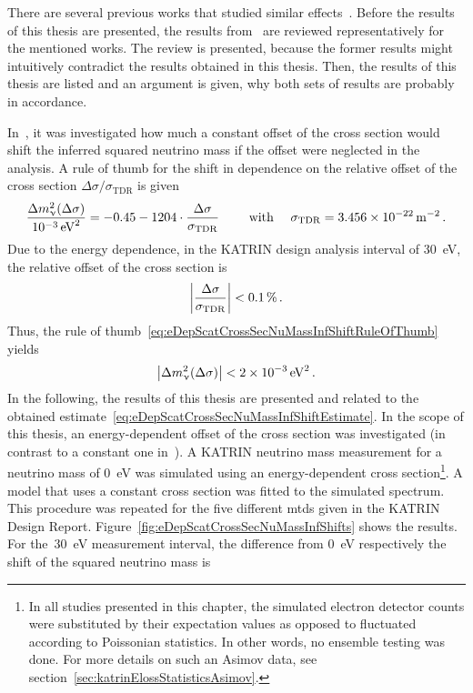 There are several previous works that studied similar effects~\cite{Antoni2015,Groh2015,SeitzM2019,Kuckert2016,Kuckert2018}. Before the results of this thesis are presented, the results from~\cite{Groh2015} are reviewed representatively for the mentioned works. The review is presented, because the former results might intuitively contradict the results obtained in this thesis. Then, the results of this thesis are listed and an argument is given, why both sets of results are probably in accordance.

In~\cite{Groh2015}, it was investigated how much a constant offset of the cross section would shift the inferred squared neutrino mass if the offset were neglected in the analysis. A rule of thumb for the shift in dependence on the relative offset of the cross section $\Delta\sigma/\sigma_\mathrm{TDR}$ is given~\cite{Groh2015}
\begin{equation}
	\label{eq:eDepScatCrossSecNuMassInfShiftRuleOfThumb}
	\frac{\Delta m_\upnu^2(\Delta\sigma)}{\SI{e-3}{eV^2}} =
	-0.45
	-1204\cdot
	\frac{
		\Delta\sigma
	}{
		\sigma_\mathrm{TDR}
	}
	\qquad \text{ with } \quad 
	\sigma_\mathrm{TDR} = \SI{3.456e-22}{m^{-2}}
	\text{\,.}
\end{equation}
Due to the energy dependence, in the KATRIN design analysis interval of \SI{30}{eV}, the relative offset of the cross section is
\begin{equation}
	\label{eq:eDepScatCrossSecNuMassInfRelativeCrossSecOffset}
	\left|
	\frac{
		\Delta\sigma
	}{
		\sigma_\mathrm{TDR}
	}
	\right| < \SI{0.1}{\percent}
	\text{\,.}
\end{equation}
Thus, the rule of thumb~\ref{eq:eDepScatCrossSecNuMassInfShiftRuleOfThumb} yields
\begin{equation}
	\label{eq:eDepScatCrossSecNuMassInfShiftEstimate}
	\left|
		\Delta m_\upnu^2(\Delta\sigma)
	\right| < \SI{2e-3}{eV^2} 
	\text{\,.}
\end{equation}
In the following, the results of this thesis are presented and related to the obtained estimate~\eqref{eq:eDepScatCrossSecNuMassInfShiftEstimate}.
In the scope of this thesis, an energy-dependent offset of the cross section was investigated (in contrast to a constant one in~\cite{Groh2015}). A KATRIN neutrino mass measurement for a neutrino mass of \SI{0}{eV} was simulated using an energy-dependent cross section\footnote{In all studies presented in this chapter, the simulated electron detector counts were substituted by their expectation values as opposed to fluctuated according to Poissonian statistics. In other words, no ensemble testing was done. For more details on such an Asimov data, see section~\ref{sec:katrinElossStatisticsAsimov}.}. A model that uses a constant cross section was fitted to the simulated spectrum. This procedure was repeated for the five different \gls{mtd}s given in the KATRIN Design Report. Figure~\ref{fig:eDepScatCrossSecNuMassInfShifts} shows the results. For the~\SI{30}{eV} measurement interval, the difference from \SI{0}{eV} respectively the shift of the squared neutrino mass is

